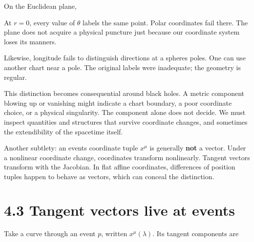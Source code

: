 \documentclass[
  11pt,
  letterpaper,
  oneside,
  openany]{scrbook}
\begin{document}
On the Euclidean plane,

\begin{center}
\begingroup
{}
\ifdim\wd\grmathbox>\linewidth
\resizebox{\linewidth}{!}{\usebox{\grmathbox}}
\else\usebox{\grmathbox}\fi
\endgroup
\end{center}

At \(r=0\), every value of \(\theta\) labels the same point. Polar
coordinates fail there. The plane does not acquire a physical puncture
just because our coordinate system loses its manners.

Likewise, longitude fails to distinguish directions at a
sphere\textquotesingle s poles. One can use another chart near a pole.
The original labels were inadequate; the geometry is regular.

This distinction becomes consequential around black holes. A metric
component blowing up or vanishing might indicate a chart boundary, a
poor coordinate choice, or a physical singularity. The component alone
does not decide. We must inspect quantities and structures that survive
coordinate changes, and sometimes the extendibility of the spacetime
itself.

Another subtlety: an event\textquotesingle s coordinate tuple \(x^\mu\)
is generally \textbf{not} a vector. Under a nonlinear coordinate change,
coordinates transform nonlinearly. Tangent vectors transform with the
Jacobian. In flat affine coordinates, differences of position tuples
happen to behave as vectors, which can conceal the distinction.

\hypertarget{tangent-vectors-live-at-events}{%
\section{4.3 Tangent vectors live at
events}\label{tangent-vectors-live-at-events}}

Take a curve through an event \(p\), written \(x^\mu(\lambda)\). Its
tangent components are

\begin{center}
\begingroup
{}
\ifdim\wd\grmathbox>\linewidth
\resizebox{\linewidth}{!}{\usebox{\grmathbox}}
\else\usebox{\grmathbox}\fi
\endgroup
\end{center}
\end{document}
